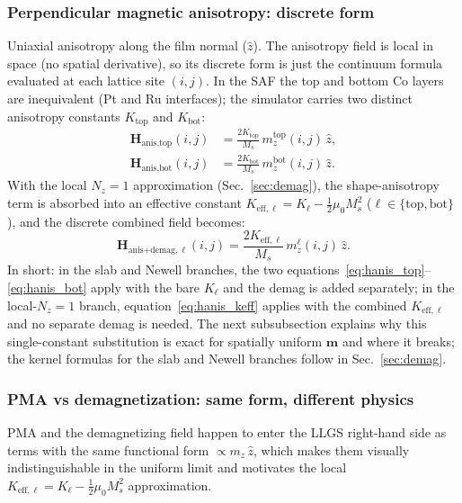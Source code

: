 \documentclass[11pt,a4paper]{article}
\newcommand{\mb}[1]{\mathbf{#1}}
\newcommand{\zhat}{\hat{z}}
\newcommand{\Ms}{M_s}
\begin{document}
\subsubsection{Perpendicular magnetic anisotropy: discrete form}

Uniaxial anisotropy along the film normal ($\zhat$).  The
anisotropy field is local in space (no spatial derivative), so
its discrete form is just the continuum formula evaluated at
each lattice site $(i, j)$.  In the SAF the top and bottom Co
layers are inequivalent (Pt and Ru interfaces); the simulator
carries two distinct anisotropy constants $K_{\text{top}}$ and
$K_{\text{bot}}$:
%
\begin{align}
\mb{H}_{\text{anis},\text{top}}(i,j) &=
    \frac{2 K_{\text{top}}}{\Ms} \, m^{\text{top}}_z(i,j) \, \zhat,
    \label{eq:hanis_top} \\
\mb{H}_{\text{anis},\text{bot}}(i,j) &=
    \frac{2 K_{\text{bot}}}{\Ms} \, m^{\text{bot}}_z(i,j) \, \zhat.
    \label{eq:hanis_bot}
\end{align}
%
With the local $N_z = 1$ approximation
(Sec.~\ref{sec:demag}), the shape-anisotropy term is absorbed
into an effective constant
$K_{\text{eff},\ell} = K_\ell - \tfrac{1}{2}\mu_0 \Ms^2$
($\ell \in \{\text{top}, \text{bot}\}$), and the discrete
combined field becomes:
%
\begin{equation}
\mb{H}_{\text{anis+demag},\ell}(i,j) =
    \frac{2 K_{\text{eff},\ell}}{\Ms} \,
    m^{\ell}_z(i,j) \, \zhat.
\label{eq:hanis_keff}
\end{equation}
%
In short: in the slab and Newell branches, the two
equations~\eqref{eq:hanis_top}--\eqref{eq:hanis_bot} apply with
the bare $K_\ell$ and the demag is added separately; in the
local-$N_z = 1$ branch, equation~\eqref{eq:hanis_keff} applies
with the combined $K_{\text{eff},\ell}$ and no separate demag is
needed.  The next subsubsection explains
why this single-constant substitution is exact for
spatially uniform $\mb{m}$ and where it breaks; the kernel
formulas for the slab and Newell branches follow in
Sec.~\ref{sec:demag}.

\subsubsection{PMA vs demagnetization: same form, different
physics}
\label{sec:pma_vs_demag}

PMA and the demagnetizing field happen to enter the LLGS
right-hand side as terms with the same functional form
$\propto m_z\,\zhat$, which makes them visually
indistinguishable in the uniform limit and motivates the
local $K_{\text{eff},\ell} = K_\ell -
\tfrac{1}{2}\mu_0 \Ms^2$ approximation.
\end{document}
